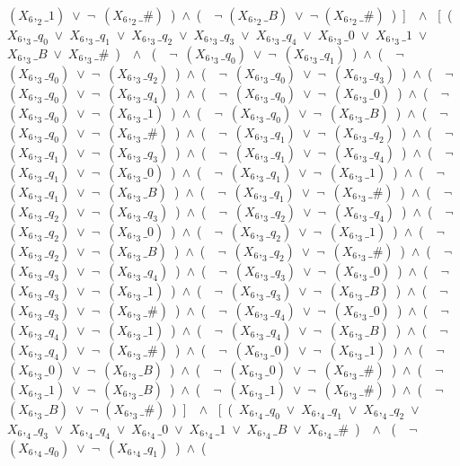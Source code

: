 ﻿\documentclass[a4paper,10pt]{article}
\begin{document}
$(X_6,_2\_1)$\ $\vee$\ $\neg$\ $(X_6,_2\_\#)$\ )\ $\wedge$\ (\ \ $\neg$ $(X_6,_2\_B)$\ $\vee$\ $\neg$ $(X_6,_2\_\#)$\ )\ ]\ \ $\wedge$ \ [\ (\ $X_6,_3\_q_0$\ $\vee$\ $X_6,_3\_q_1$\ $\vee$\ $X_6,_3\_q_2$\ $\vee$\ $X_6,_3\_q_3$\ $\vee$\ $X_6,_3\_q_4$\ $\vee$\ $X_6,_3\_0$\ $\vee$\ $X_6,_3\_1$\ $\vee$\ $X_6,_3\_B$\ $\vee$\ $X_6,_3\_\#$\ )\ \ $\wedge$ \ (\ \ $\neg$\ $(X_6,_3\_q_0)$\ $\vee$\ $\neg$\ $(X_6,_3\_q_1)$\ )\ $\wedge$\ (\ \ $\neg$\ $(X_6,_3\_q_0)$\ $\vee$\ $\neg$\ $(X_6,_3\_q_2)$\ )\ $\wedge$\ (\ \ $\neg$\ $(X_6,_3\_q_0)$\ $\vee$\ $\neg$\ $(X_6,_3\_q_3)$\ )\ $\wedge$\ (\ \ $\neg$\ $(X_6,_3\_q_0)$\ $\vee$\ $\neg$\ $(X_6,_3\_q_4)$\ )\ $\wedge$\ (\ \ $\neg$\ $(X_6,_3\_q_0)$\ $\vee$\ $\neg$\ $(X_6,_3\_0)$\ )\ $\wedge$\ (\ \ $\neg$\ $(X_6,_3\_q_0)$\ $\vee$\ $\neg$\ $(X_6,_3\_1)$\ )\ $\wedge$\ (\ \ $\neg$\ $(X_6,_3\_q_0)$\ $\vee$\ $\neg$\ $(X_6,_3\_B)$\ )\ $\wedge$\ (\ \ $\neg$\ $(X_6,_3\_q_0)$\ $\vee$\ $\neg$\ $(X_6,_3\_\#)$\ )\ $\wedge$\ (\ \ $\neg$\ $(X_6,_3\_q_1)$\ $\vee$\ $\neg$\ $(X_6,_3\_q_2)$\ )\ $\wedge$\ (\ \ $\neg$\ $(X_6,_3\_q_1)$\ $\vee$\ $\neg$\ $(X_6,_3\_q_3)$\ )\ $\wedge$\ (\ \ $\neg$\ $(X_6,_3\_q_1)$\ $\vee$\ $\neg$\ $(X_6,_3\_q_4)$\ )\ $\wedge$\ (\ \ $\neg$\ $(X_6,_3\_q_1)$\ $\vee$\ $\neg$\ $(X_6,_3\_0)$\ )\ $\wedge$\ (\ \ $\neg$\ $(X_6,_3\_q_1)$\ $\vee$\ $\neg$\ $(X_6,_3\_1)$\ )\ $\wedge$\ (\ \ $\neg$\ $(X_6,_3\_q_1)$\ $\vee$\ $\neg$\ $(X_6,_3\_B)$\ )\ $\wedge$\ (\ \ $\neg$\ $(X_6,_3\_q_1)$\ $\vee$\ $\neg$\ $(X_6,_3\_\#)$\ )\ $\wedge$\ (\ \ $\neg$\ $(X_6,_3\_q_2)$\ $\vee$\ $\neg$\ $(X_6,_3\_q_3)$\ )\ $\wedge$\ (\ \ $\neg$\ $(X_6,_3\_q_2)$\ $\vee$\ $\neg$\ $(X_6,_3\_q_4)$\ )\ $\wedge$\ (\ \ $\neg$\ $(X_6,_3\_q_2)$\ $\vee$\ $\neg$\ $(X_6,_3\_0)$\ )\ $\wedge$\ (\ \ $\neg$\ $(X_6,_3\_q_2)$\ $\vee$\ $\neg$\ $(X_6,_3\_1)$\ )\ $\wedge$\ (\ \ $\neg$\ $(X_6,_3\_q_2)$\ $\vee$\ $\neg$\ $(X_6,_3\_B)$\ )\ $\wedge$\ (\ \ $\neg$\ $(X_6,_3\_q_2)$\ $\vee$\ $\neg$\ $(X_6,_3\_\#)$\ )\ $\wedge$\ (\ \ $\neg$\ $(X_6,_3\_q_3)$\ $\vee$\ $\neg$\ $(X_6,_3\_q_4)$\ )\ $\wedge$\ (\ \ $\neg$\ $(X_6,_3\_q_3)$\ $\vee$\ $\neg$\ $(X_6,_3\_0)$\ )\ $\wedge$\ (\ \ $\neg$\ $(X_6,_3\_q_3)$\ $\vee$\ $\neg$\ $(X_6,_3\_1)$\ )\ $\wedge$\ (\ \ $\neg$\ $(X_6,_3\_q_3)$\ $\vee$\ $\neg$\ $(X_6,_3\_B)$\ )\ $\wedge$\ (\ \ $\neg$\ $(X_6,_3\_q_3)$\ $\vee$\ $\neg$\ $(X_6,_3\_\#)$\ )\ $\wedge$\ (\ \ $\neg$\ $(X_6,_3\_q_4)$\ $\vee$\ $\neg$\ $(X_6,_3\_0)$\ )\ $\wedge$\ (\ \ $\neg$\ $(X_6,_3\_q_4)$\ $\vee$\ $\neg$\ $(X_6,_3\_1)$\ )\ $\wedge$\ (\ \ $\neg$\ $(X_6,_3\_q_4)$\ $\vee$\ $\neg$\ $(X_6,_3\_B)$\ )\ $\wedge$\ (\ \ $\neg$\ $(X_6,_3\_q_4)$\ $\vee$\ $\neg$\ $(X_6,_3\_\#)$\ )\ $\wedge$\ (\ \ $\neg$\ $(X_6,_3\_0)$\ $\vee$\ $\neg$\ $(X_6,_3\_1)$\ )\ $\wedge$\ (\ \ $\neg$\ $(X_6,_3\_0)$\ $\vee$\ $\neg$\ $(X_6,_3\_B)$\ )\ $\wedge$\ (\ \ $\neg$\ $(X_6,_3\_0)$\ $\vee$\ $\neg$\ $(X_6,_3\_\#)$\ )\ $\wedge$\ (\ \ $\neg$\ $(X_6,_3\_1)$\ $\vee$\ $\neg$\ $(X_6,_3\_B)$\ )\ $\wedge$\ (\ \ $\neg$\ $(X_6,_3\_1)$\ $\vee$\ $\neg$\ $(X_6,_3\_\#)$\ )\ $\wedge$\ (\ \ $\neg$ $(X_6,_3\_B)$\ $\vee$\ $\neg$ $(X_6,_3\_\#)$\ )\ ]\ \ $\wedge$ \ [\ (\ $X_6,_4\_q_0$\ $\vee$\ $X_6,_4\_q_1$\ $\vee$\ $X_6,_4\_q_2$\ $\vee$\ $X_6,_4\_q_3$\ $\vee$\ $X_6,_4\_q_4$\ $\vee$\ $X_6,_4\_0$\ $\vee$\ $X_6,_4\_1$\ $\vee$\ $X_6,_4\_B$\ $\vee$\ $X_6,_4\_\#$\ )\ \ $\wedge$ \ (\ \ $\neg$\ $(X_6,_4\_q_0)$\ $\vee$\ $\neg$\ $(X_6,_4\_q_1)$\ )\ $\wedge$\ (\ \ 
\end{document}
